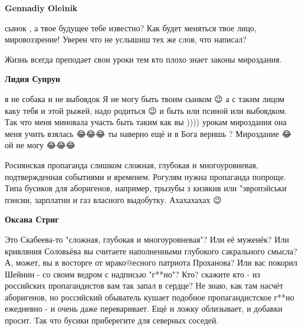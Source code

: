 \begin{itemize}
\begin{itemize}
 
\textbf{Gennadiy Oleinik} 

сынок , а твое будущее тебе известно? Как будет меняться твое лицо,
мировоззрение! Уверен что не услышиш тех же слов, что написал?

Жизнь всегда преподает свои уроки тем кто плохо знает законы мироздания.

 
\textbf{Лидия Супрун} 

я не собака и не выбоядок Я не могу быть твоим сынком 😉 а с таким лицом каку
тебя и этой рыжей, надо родиться 😉 и быть или псиной или выбоядком. Так что
меня миновала участь быть таким как вы )))) урокам мироздания она меня учить
взялась 😂😂😂 ты наверно ещё и в Бога веришь ? Мироздание 😂 ой не могу 😂😂😂

\end{itemize}

 

Росиянская пропаганда слишком сложная, глубокая и многоуровневая,
подтвержденная событиями и временем. Рогулям нужна пропаганда попроще. Типа
бусиков для аборигенов, например, трызубы з кизякив или "эвропэйськи пэнсии,
зарплатни и газ власного выдобутку. Ахахахахах 😉

\begin{itemize}
 
\textbf{Оксана Стриг} 

Это Скабеева-то "сложная, глубокая и многоуровневая"? Или
её муженёк? Или кривляния Соловьёва вы считаете наполненными глубокого
сакрального смысла? А, может, вы в восторге от мрако@есного патриота Проханова?
Или вас покорил Шейнин - со своим ведром с надписью "г**но"? Кто? скажите кто -
из российских пропагандистов вам так запал в сердце? Не знаю, как там насчёт
аборигенов, но российский обыватель кушает подобное пропагандистское г**но
ежедневно - и очень даже переваривает. Ещё и ложку облизывает, и добавки
просит. Так что бусики приберегите для северных соседей.


\end{itemize}
\end{itemize}
